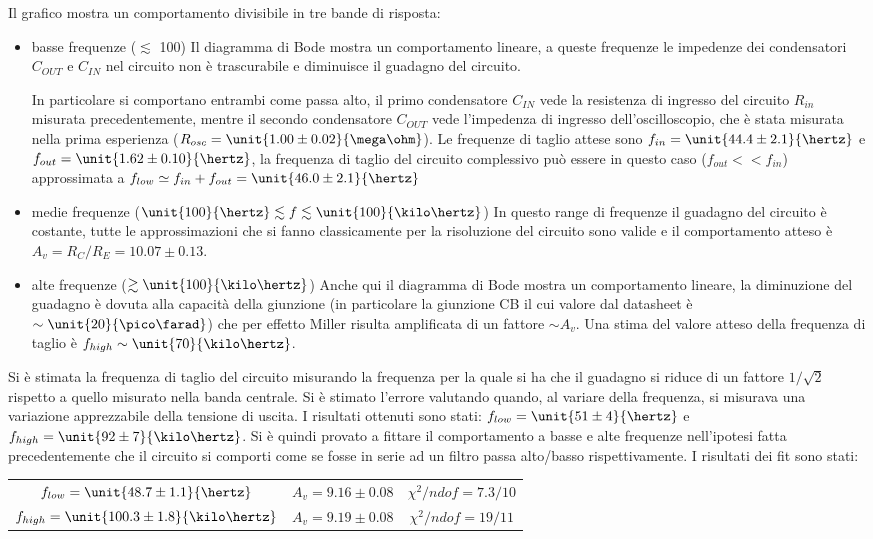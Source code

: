 \documentclass[10pt,a4paper]{article}
\begin{document}
Il grafico mostra un comportamento divisibile in tre bande di risposta:
\begin{itemize}
	\item {basse frequenze ($\lesssim$ \unit{100}{\hertz})} Il diagramma di Bode mostra un comportamento lineare, a queste frequenze le impedenze dei condensatori $C_{OUT}$ e $C_{IN}$ nel circuito non è trascurabile e diminuisce il guadagno del circuito. 
	
	In particolare si comportano entrambi come passa alto, il primo condensatore $C_{IN}$ vede la resistenza di ingresso del circuito $R_{in}$ misurata precedentemente, mentre il secondo condensatore $C_{OUT}$ vede l'impedenza di ingresso dell'oscilloscopio, che è stata misurata nella prima esperienza ($R_{osc} = \unit{1.00 \pm 0.02}{\mega\ohm}$). Le frequenze di taglio attese sono $f_{in}=\unit{44.4 \pm 2.1}{\hertz}$ e $f_{out}=\unit{1.62 \pm 0.10}{\hertz}$, la frequenza di taglio del circuito complessivo può essere in questo caso ($f_{out} << f_{in}$) approssimata a $f_{low} \simeq f_{in} + f_{out} = \unit{46.0 \pm 2.1}{\hertz}$
	
	
	\item {medie frequenze ($\unit{100}{\hertz} \lesssim f \lesssim \unit{100}{\kilo\hertz}$)} In questo range di frequenze il guadagno del circuito è costante, tutte le approssimazioni che si fanno classicamente per la risoluzione del circuito sono valide e il comportamento atteso è $A_v = R_C/R_E = 10.07\pm0.13$.
	
	\item {alte frequenze ($\gtrsim \unit{100}{\kilo\hertz}$)} Anche qui il diagramma di Bode mostra un comportamento lineare, la diminuzione del guadagno è dovuta alla capacità della giunzione (in particolare la giunzione CB il cui valore dal datasheet è $\sim \unit{20}{\pico\farad}$) che per effetto Miller risulta amplificata di un fattore $\sim A_v$. Una stima del valore atteso della frequenza di taglio è $f_{high} \sim \unit{70}{\kilo\hertz}$.
\end{itemize}

Si è stimata la frequenza di taglio del circuito misurando la frequenza per la quale si ha che il guadagno si riduce di un fattore $1/\sqrt{2}$ rispetto a quello misurato nella banda centrale. Si è stimato l'errore valutando quando, al variare della frequenza, si misurava una variazione apprezzabile della tensione di uscita.
I risultati ottenuti sono stati: $f_{low} = \unit{51 \pm 4}{\hertz}$ e $f_{high}= \unit{92 \pm 7}{\kilo\hertz}$.
Si è quindi provato a fittare il comportamento a basse e alte frequenze nell'ipotesi fatta precedentemente che il circuito si comporti come se fosse in serie ad un filtro passa alto/basso rispettivamente.
I risultati dei fit sono stati:
\begin{table}[h!]
	\centering
\begin{tabular}{ccc}
$f_{low}=\unit{48.7 \pm 1.1}{\hertz}$ & $A_v = 9.16 \pm 0.08$ & $\chi^2/ndof = 7.3 / 10$ \\
$f_{high}=\unit{100.3 \pm 1.8}{\kilo\hertz}$ & $A_v = 9.19 \pm 0.08$ & $\chi^2/ndof = 19 / 11$
\end{tabular}
\end{table}
\end{document}
